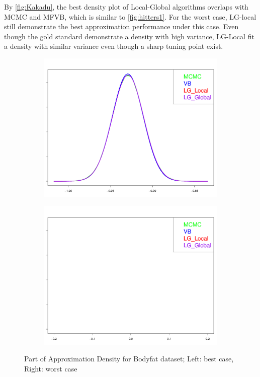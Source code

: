 By \autoref{fig:Kakadu}, the best density plot of Local-Global algorithms overlaps with MCMC and MFVB, which is similar to \autoref{fig:hitters1}. For the worst case, LG-local still demonstrate the best approximation performance under this case. Even though the gold standard demonstrate a density with high variance, LG-Local fit a density with similar variance even though a sharp tuning point exist.


\begin{figure}[h]
	\begin{subfigure}{0.5\textwidth}
		\centering
		\includegraphics[page = 1, width=\linewidth,keepaspectratio]{lasso_densities_Bodyfat.pdf}
	\end{subfigure}
	\begin{subfigure}{0.5\textwidth}
		\includegraphics[page = 8, width=\linewidth,keepaspectratio]{lasso_densities_Bodyfat-1.pdf}
	\end{subfigure}
	\caption{Part of Approximation Density for Bodyfat dataset; Left: best case, Right: worst case}
	\label{fig:Bodyfat}
\end{figure}

